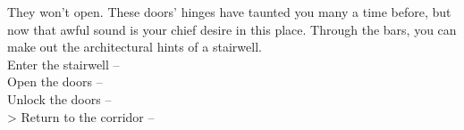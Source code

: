 They won’t open. These doors’ hinges have taunted you many a time before, but now that awful sound is your chief desire in this place. Through the bars, you can make out the architectural hints of a stairwell.\\

 Enter the stairwell -- \\
 Open the doors -- \\
 Unlock the doors --  \\
> Return to the corridor -- 